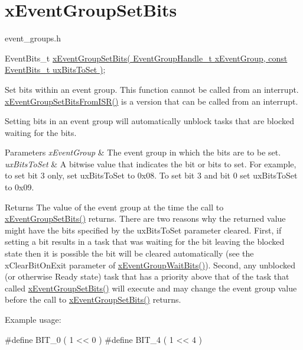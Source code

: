 \hypertarget{group__xEventGroupSetBits}{}\section{x\+Event\+Group\+Set\+Bits}
\label{group__xEventGroupSetBits}
event\+\_\+groups.\+h 
\begin{DoxyPre}
   EventBits\_t \hyperlink{event__groups_8h_a02d7b3bb55f7e11d9c47116266c5fb2e}{xEventGroupSetBits( EventGroupHandle\_t xEventGroup, const EventBits\_t uxBitsToSet )};
\end{DoxyPre}


Set bits within an event group. This function cannot be called from an interrupt. \hyperlink{event__groups_8h_a62b68278abac6358369ae8e390988a02}{x\+Event\+Group\+Set\+Bits\+From\+I\+S\+R()} is a version that can be called from an interrupt.

Setting bits in an event group will automatically unblock tasks that are blocked waiting for the bits.


\begin{DoxyParams}{Parameters}
{\em x\+Event\+Group} & The event group in which the bits are to be set.\\
\hline
{\em ux\+Bits\+To\+Set} & A bitwise value that indicates the bit or bits to set. For example, to set bit 3 only, set ux\+Bits\+To\+Set to 0x08. To set bit 3 and bit 0 set ux\+Bits\+To\+Set to 0x09.\\
\hline
\end{DoxyParams}
\begin{DoxyReturn}{Returns}
The value of the event group at the time the call to \hyperlink{event__groups_8h_a02d7b3bb55f7e11d9c47116266c5fb2e}{x\+Event\+Group\+Set\+Bits()} returns. There are two reasons why the returned value might have the bits specified by the ux\+Bits\+To\+Set parameter cleared. First, if setting a bit results in a task that was waiting for the bit leaving the blocked state then it is possible the bit will be cleared automatically (see the x\+Clear\+Bit\+On\+Exit parameter of \hyperlink{event__groups_8h_aab9d5b405bc57b7624dcabe9a9a503db}{x\+Event\+Group\+Wait\+Bits()}). Second, any unblocked (or otherwise Ready state) task that has a priority above that of the task that called \hyperlink{event__groups_8h_a02d7b3bb55f7e11d9c47116266c5fb2e}{x\+Event\+Group\+Set\+Bits()} will execute and may change the event group value before the call to \hyperlink{event__groups_8h_a02d7b3bb55f7e11d9c47116266c5fb2e}{x\+Event\+Group\+Set\+Bits()} returns.
\end{DoxyReturn}
Example usage\+: 
\begin{DoxyPre}
  #define BIT\_0 ( 1 << 0 )
  #define BIT\_4 ( 1 << 4 )\end{DoxyPre}



